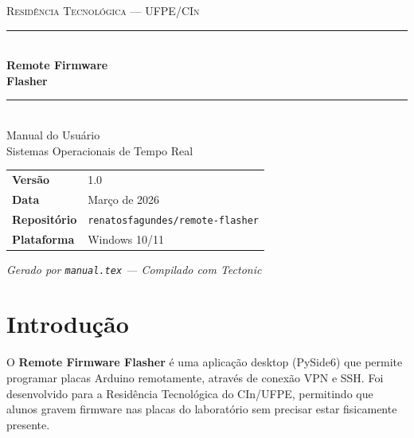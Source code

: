 \documentclass[12pt,a4paper]{article}
\begin{document}
\begin{titlepage}
  \pagecolor{azulescuro}
  \color{white}
  \vspace*{2cm}

  \begin{center}
    {\fontsize{11}{13}\selectfont\scshape Residência Tecnológica --- UFPE/CIn}\\[0.8cm]
    \rule{\linewidth}{1.5pt}\\[0.6cm]
    {\fontsize{28}{34}\selectfont\bfseries Remote Firmware\\Flasher}\\[0.4cm]
    \rule{\linewidth}{1.5pt}\\[0.8cm]
    {\fontsize{15}{18}\selectfont Manual do Usuário}\\[0.3cm]
    {\fontsize{12}{15}\selectfont\color{azulclaro}%
      Sistemas Operacionais de Tempo Real}\\[2.5cm]
  \end{center}

  \begin{tcolorbox}[
    colback=white, colframe=white,
    coltext=azulescuro,
    width=0.75\textwidth,
    center, arc=3pt,
    left=10pt, right=10pt, top=6pt, bottom=6pt
  ]
    \small
    \begin{tabular}{@{}ll@{}}
      \textbf{Versão}          & 1.0 \\
      \textbf{Data}            & Março de 2026 \\
      \textbf{Repositório}     & \texttt{renatosfagundes/remote-flasher} \\
      \textbf{Plataforma}      & Windows 10/11 \\
    \end{tabular}
  \end{tcolorbox}

  \vfill
  {\small\itshape Gerado por \texttt{manual.tex} --- Compilado com Tectonic}
\end{titlepage}
\pagecolor{white}
\color{black}

\tableofcontents
\newpage

\section{Introdução}

O \textbf{Remote Firmware Flasher} é uma aplicação desktop (PySide6) que permite programar placas Arduino remotamente, através de conexão VPN e SSH. Foi desenvolvido para a Residência Tecnológica do CIn/UFPE, permitindo que alunos gravem firmware nas placas do laboratório sem precisar estar fisicamente presente.
\end{document}
